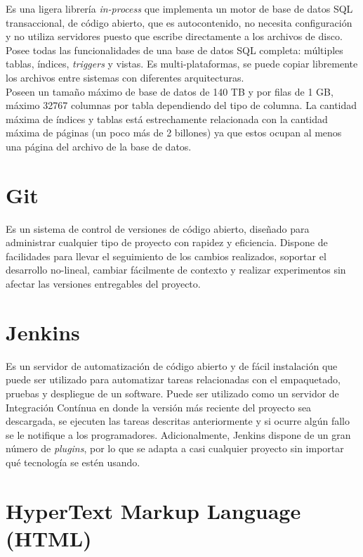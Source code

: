 Es una ligera librería \textit{in-process} que implementa un motor de base de datos SQL transaccional, de código abierto, que es autocontenido, no necesita configuración y no utiliza servidores puesto que escribe directamente a los archivos de disco. Posee todas las funcionalidades de una base de datos SQL completa: múltiples tablas, índices, \textit{triggers} y vistas.  Es multi-plataformas, se puede copiar libremente los archivos entre sistemas con diferentes arquitecturas. \\

Poseen un tamaño máximo de base de datos de 140 TB y por filas de 1 GB,  máximo 32767 columnas por tabla dependiendo del tipo de columna. La cantidad máxima de índices y tablas está estrechamente relacionada con la cantidad máxima de páginas (un poco más de 2 billones) ya que estos ocupan al menos una página del archivo de la base de datos. \cite{SQLite}

\section{Git}

Es un sistema de control de versiones de código abierto, diseñado para administrar cualquier tipo de proyecto con rapidez y eficiencia. Dispone de facilidades para llevar el seguimiento de los cambios realizados, soportar el desarrollo no-lineal, cambiar fácilmente de contexto y realizar experimentos sin afectar las versiones entregables del proyecto. \cite{Git}

\section{Jenkins}

Es un servidor de automatización de código abierto y de fácil instalación que puede ser utilizado para automatizar tareas relacionadas con el empaquetado, pruebas y despliegue de un software. Puede ser utilizado como un servidor de Integración Contínua en donde la versión más reciente del proyecto sea descargada, se ejecuten las tareas descritas anteriormente y si ocurre algún fallo se le notifique a los programadores. Adicionalmente, Jenkins dispone de un gran número de \textit{plugins}, por lo que se adapta a casi cualquier proyecto sin importar qué tecnología se estén usando. \cite{Jenkins}

\section{HyperText Markup Language (HTML)}

